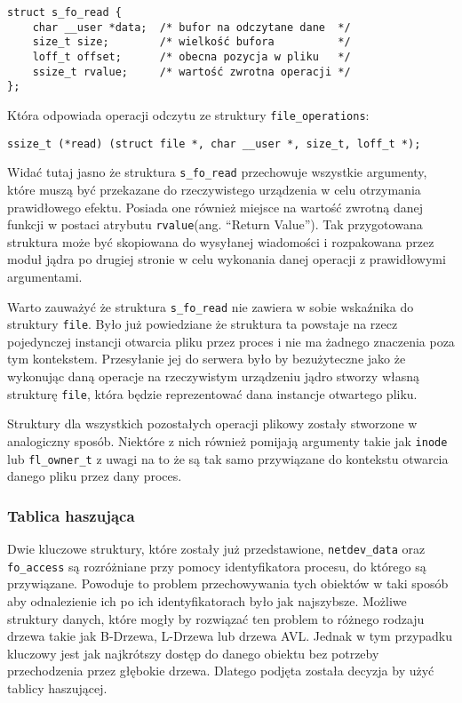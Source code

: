 \begin{verbatim}
struct s_fo_read {
    char __user *data;  /* bufor na odczytane dane  */
    size_t size;        /* wielkość bufora          */
    loff_t offset;      /* obecna pozycja w pliku   */
    ssize_t rvalue;     /* wartość zwrotna operacji */
};
\end{verbatim}

Która odpowiada operacji odczytu ze struktury \texttt{file\_operations}:

\begin{verbatim}
ssize_t (*read) (struct file *, char __user *, size_t, loff_t *);
\end{verbatim}

Widać tutaj jasno że struktura \texttt{s\_fo\_read} przechowuje
wszystkie argumenty, które muszą być przekazane do rzeczywistego
urządzenia w celu otrzymania prawidłowego efektu. Posiada one również
miejsce na wartość zwrotną danej funkcji w postaci atrybutu
\texttt{rvalue}(ang. ``Return Value''). Tak przygotowana struktura może
być skopiowana do wysyłanej wiadomości i rozpakowana przez moduł jądra
po drugiej stronie w celu wykonania danej operacji z prawidłowymi
argumentami.

Warto zauważyć że struktura \texttt{s\_fo\_read} nie zawiera w sobie
wskaźnika do struktury \texttt{file}. Było już powiedziane że struktura
ta powstaje na rzecz pojedynczej instancji otwarcia pliku przez proces i
nie ma żadnego znaczenia poza tym kontekstem. Przesyłanie jej do serwera
było by bezużyteczne jako że wykonując daną operacje na rzeczywistym
urządzeniu jądro stworzy własną strukturę \texttt{file}, która będzie
reprezentować dana instancje otwartego pliku.

Struktury dla wszystkich pozostałych operacji plikowy zostały stworzone
w analogiczny sposób. Niektóre z nich również pomijają argumenty takie
jak \texttt{inode} lub \texttt{fl\_owner\_t} z uwagi na to że są tak
samo przywiązane do kontekstu otwarcia danego pliku przez dany proces.

\subsubsection{Tablica haszująca}

Dwie kluczowe struktury, które zostały już przedstawione,
\texttt{netdev\_data} oraz \texttt{fo\_access} są rozróżniane przy
pomocy identyfikatora procesu, do którego są przywiązane. Powoduje to
problem przechowywania tych obiektów w taki sposób aby odnalezienie ich
po ich identyfikatorach było jak najszybsze. Możliwe struktury danych,
które mogły by rozwiązać ten problem to różnego rodzaju drzewa takie jak
B-Drzewa, L-Drzewa lub drzewa AVL. Jednak w tym przypadku kluczowy jest
jak najkrótszy dostęp do danego obiektu bez potrzeby przechodzenia przez
głębokie drzewa. Dlatego podjęta została decyzja by użyć tablicy
haszującej.

